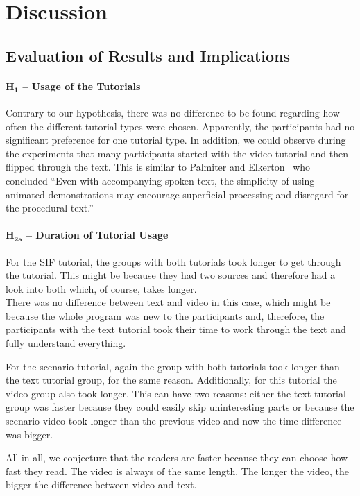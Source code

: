 \section{Discussion} 
\subsection{Evaluation of Results and Implications}
\paragraph{$\mathbf{H_1}$ -- Usage of the Tutorials}
Contrary to our hypothesis, there was no difference to be found regarding how often the different tutorial types were chosen. Apparently, the participants had no significant preference for one tutorial type. In addition, we could observe during the experiments that many participants started with the video tutorial and then flipped through the text. This is similar to Palmiter and Elkerton~\cite{palmiter} who concluded ``Even with accompanying spoken text, the simplicity of using animated demonstrations may encourage superficial processing and disregard for the procedural text.''


\paragraph{$\mathbf{H_{2a}}$ -- Duration of Tutorial Usage}
For the SIF tutorial, the groups with both tutorials took longer to get through the tutorial. This might be because they had two sources and therefore had a look into both which, of course, takes longer. \\
There was no difference between text and video in this case, which might be because the whole program was new to the participants and, therefore, the participants with the text tutorial took their time to work through the text and fully understand everything. 

For the scenario tutorial, again the group with both tutorials took longer than the text tutorial group, for the same reason. Additionally, for this tutorial the video group also took longer. This can have two reasons: either the text tutorial group was faster because they could easily skip uninteresting parts or because the scenario video took longer than the previous video and now the time difference was bigger.  

All in all, we conjecture that the readers are faster because they can choose how fast they read. The video is always of the same length. The longer the video, the bigger the difference between video and text. 


